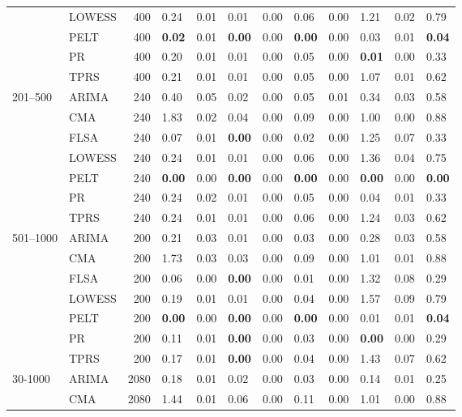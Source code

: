 \begin{table}[ht]
\begin{tabular}{llrlrlrlrlrl}
   & LOWESS & 400 & 0.24 & 0.01 & 0.01 & 0.00 & 0.06 & 0.00 & 1.21 & 0.02 & 0.79 \\ 
   & PELT & 400 & \textbf{0.02} & 0.01 & \textbf{0.00} & 0.00 & \textbf{0.00} & 0.00 & 0.03 & 0.01 & \textbf{0.04} \\ 
   & PR & 400 & 0.20 & 0.01 & 0.01 & 0.00 & 0.05 & 0.00 & \textbf{0.01} & 0.00 & 0.33 \\ 
   & TPRS & 400 & 0.21 & 0.01 & 0.01 & 0.00 & 0.05 & 0.00 & 1.07 & 0.01 & 0.62 \\ 
  201–500 & ARIMA & 240 & 0.40 & 0.05 & 0.02 & 0.00 & 0.05 & 0.01 & 0.34 & 0.03 & 0.58 \\ 
   & CMA & 240 & 1.83 & 0.02 & 0.04 & 0.00 & 0.09 & 0.00 & 1.00 & 0.00 & 0.88 \\ 
   & FLSA & 240 & 0.07 & 0.01 & \textbf{0.00} & 0.00 & 0.02 & 0.00 & 1.25 & 0.07 & 0.33 \\ 
   & LOWESS & 240 & 0.24 & 0.01 & 0.01 & 0.00 & 0.06 & 0.00 & 1.36 & 0.04 & 0.75 \\ 
   & PELT & 240 & \textbf{0.00} & 0.00 & \textbf{0.00} & 0.00 & \textbf{0.00} & 0.00 & \textbf{0.00} & 0.00 & \textbf{0.00} \\ 
   & PR & 240 & 0.24 & 0.02 & 0.01 & 0.00 & 0.05 & 0.00 & 0.04 & 0.01 & 0.33 \\ 
   & TPRS & 240 & 0.24 & 0.01 & 0.01 & 0.00 & 0.06 & 0.00 & 1.24 & 0.03 & 0.62 \\ 
  501–1000 & ARIMA & 200 & 0.21 & 0.03 & 0.01 & 0.00 & 0.03 & 0.00 & 0.28 & 0.03 & 0.58 \\ 
   & CMA & 200 & 1.73 & 0.03 & 0.03 & 0.00 & 0.09 & 0.00 & 1.01 & 0.01 & 0.88 \\ 
   & FLSA & 200 & 0.06 & 0.00 & \textbf{0.00} & 0.00 & 0.01 & 0.00 & 1.32 & 0.08 & 0.29 \\ 
   & LOWESS & 200 & 0.19 & 0.01 & 0.01 & 0.00 & 0.04 & 0.00 & 1.57 & 0.09 & 0.79 \\ 
   & PELT & 200 & \textbf{0.00} & 0.00 & \textbf{0.00} & 0.00 & \textbf{0.00} & 0.00 & 0.01 & 0.01 & \textbf{0.04} \\ 
   & PR & 200 & 0.11 & 0.01 & \textbf{0.00} & 0.00 & 0.03 & 0.00 & \textbf{0.00} & 0.00 & 0.29 \\ 
   & TPRS & 200 & 0.17 & 0.01 & \textbf{0.00} & 0.00 & 0.04 & 0.00 & 1.43 & 0.07 & 0.62 \\ 
  30-1000 & ARIMA & 2080 & 0.18 & 0.01 & 0.02 & 0.00 & 0.03 & 0.00 & 0.14 & 0.01 & 0.25 \\ 
   & CMA & 2080 & 1.44 & 0.01 & 0.06 & 0.00 & 0.11 & 0.00 & 1.01 & 0.00 & 0.88 \\ 

\end{tabular}
\end{table}
